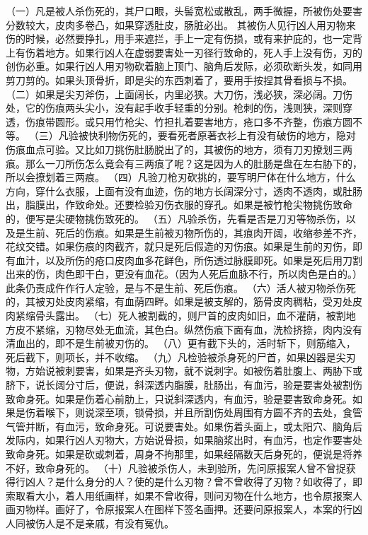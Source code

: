 \documentclass[12pt,UTF8]{ctexbook}
\begin{document}
（一）凡是被人杀伤死的，其尸口眼，头髻宽松或散乱，两手微握，所被伤处要害分数较大，皮肉多卷凸，如果穿透肚皮，肠脏必出。
其被伤人见行凶人用刃物来伤的时候，必然要挣扎，用手来遮拦，手上一定有伤损，或有来护庇的，也一定背上有伤着地方。如果行凶人在虚弱要害处一刃径行致命的，死人手上没有伤，刃的创伤必重。如果行凶人用刃物砍着脑上顶门、脑角后发际，必须砍断头发，如同用剪刀剪的。如果头顶骨折，即是尖的东西刺着了，要用手按捏其骨看损与不损。
（二）如果是尖刃斧伤，上面阔长，内里必狭。大刀伤，浅必狭，深必阔。刀伤处，它的伤痕两头尖小，没有起手收手轻重的分别。枪刺的伤，浅则狭，深则穿透，伤痕带圆形。或只用竹枪尖、竹担扎着要害地方，疮口多不齐整，伤痕方圆不等。
（三）凡验被快利物伤死的，要看死者原著衣衫上有没有破伤的地方，隐对伤痕血点可验。又比如刀挑伤肚肠脱出了的，其被伤的地方，须有刀刃撩划三两痕。那么一刀所伤怎么竟会有三两痕了呢？这是因为人的肚肠是盘在左右胁下的，所以会撩划着三两痕。
（四）凡验刀枪刃砍挑的，要写明尸体在什么地方，什么方向，穿什么衣服，上面有没有血迹，伤的地方长阔深分寸，透肉不透肉，或肚肠出，脂膜出，作致命处。还要检验刃伤衣服的穿孔。如果是被竹枪尖物挑伤致命的，便写是尖硬物挑伤致死的。
（五）凡验杀伤，先看是否是刀刃等物杀伤，以及是生前、死后的伤痕。如果是生前被刃物所伤的，其痕肉开阔，收缩参差不齐，花纹交错。如果伤痕的肉截齐，就只是死后假造的刃伤痕。如果是生前的刃伤，即有血汁，以及所伤的疮口皮肉血多花鲜色，所伤透过脉膜即死。如果是死后用刀割出来的伤，肉色即干白，更没有血花。（因为人死后血脉不行，所以肉色是白的。）
此条仍责成仵作行人定验，是与不是生前、死后伤痕。
（六）活人被刃物杀伤死的，其被刃处皮肉紧缩，有血荫四畔。如果是被支解的，筋骨皮肉稠粘，受刃处皮肉紧缩骨头露出。
（七）死人被割截的，则尸首的皮肉如旧，血不灌荫，被割地方皮不紧缩，刃物尽处无血流，其色白。纵然伤痕下面有血，洗检挤捺，肉内没有清血出的，即不是生前被刃伤的。
（八）更有截下头的，活时斩下，则筋缩入，死后截下，则项长，并不收缩。
（九）凡检验被杀身死的尸首，如果凶器是尖刃物，方始说被刺要害，如果是齐头刃物，就不说刺字。如被伤着肚腹上、两胁下或脐下，说长阔分寸后，便说，斜深透内脂膜，肚肠出，有血污，验是要害处被割伤致命身死。如果是伤着心前肋上，只说斜深透内，有血污，验是要害致命身死。如果是伤着喉下，则说深至项，锁骨损，并且所割伤处周围有方圆不齐的去处，食管气管并断，有血污，致命身死。可说要害处。如果伤着头面上，或太阳穴、脑角后发际内，如果行凶人刃物大，方始说骨损，如果脑浆出时，有血污，也定作要害处致命身死。如果是砍或刺着，周身不拘那里，如果经隔数天后身死的，便说是将养不好，致命身死的。
（十）凡验被杀伤人，未到验所，先问原报案人曾不曾捉获得行凶人？是什么身分的人？使的是什么刃物？曾不曾收得了刃物？如收得了，即索取看大小，着人用纸画样，如果不曾收得，则问刃物在什么地方，也令原报案人画刃物样。画好了，令原报案人在图样下签名画押。还要问原报案人，本案的行凶人同被伤人是不是亲戚，有没有冤仇。
\end{document}
